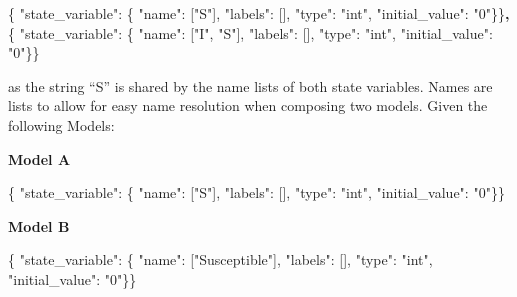 \documentclass[]{article}
\newenvironment{Shaded}{}{}
\newcommand{\DataTypeTok}[1]{\textcolor[rgb]{0.56,0.13,0.00}{#1}}
\newcommand{\StringTok}[1]{\textcolor[rgb]{0.25,0.44,0.63}{#1}}
\newcommand{\OtherTok}[1]{\textcolor[rgb]{0.00,0.44,0.13}{#1}}
\newcommand{\FunctionTok}[1]{\textcolor[rgb]{0.02,0.16,0.49}{#1}}
\newcommand{\ErrorTok}[1]{\textcolor[rgb]{1.00,0.00,0.00}{\textbf{#1}}}
\begin{document}
\begin{Shaded}
\begin{Highlighting}[]
\FunctionTok{\{} \DataTypeTok{"state_variable"}\FunctionTok{:} \FunctionTok{\{} \DataTypeTok{"name"}\FunctionTok{:} \OtherTok{[}\StringTok{"S"}\OtherTok{]}\FunctionTok{,} \DataTypeTok{"labels"}\FunctionTok{:} \OtherTok{[]}\FunctionTok{,} \DataTypeTok{"type"}\FunctionTok{:} \StringTok{"int"}\FunctionTok{,}
    \DataTypeTok{"initial_value"}\FunctionTok{:} \StringTok{"0"}\FunctionTok{\}\}}\ErrorTok{,}
\FunctionTok{\{} \DataTypeTok{"state_variable"}\FunctionTok{:} \FunctionTok{\{} \DataTypeTok{"name"}\FunctionTok{:} \OtherTok{[}\StringTok{"I"}\OtherTok{,} \StringTok{"S"}\OtherTok{]}\FunctionTok{,} \DataTypeTok{"labels"}\FunctionTok{:} \OtherTok{[]}\FunctionTok{,} \DataTypeTok{"type"}\FunctionTok{:} \StringTok{"int"}\FunctionTok{,}
    \DataTypeTok{"initial_value"}\FunctionTok{:} \StringTok{"0"}\FunctionTok{\}\}}
\end{Highlighting}
\end{Shaded}

as the string ``S'' is shared by the name lists of both state variables.
Names are lists to allow for easy name resolution when composing two
models. Given the following Models:

\textbf{Model A}

\begin{Shaded}
\begin{Highlighting}[]
\FunctionTok{\{} \DataTypeTok{"state_variable"}\FunctionTok{:} \FunctionTok{\{} \DataTypeTok{"name"}\FunctionTok{:} \OtherTok{[}\StringTok{"S"}\OtherTok{]}\FunctionTok{,} \DataTypeTok{"labels"}\FunctionTok{:} \OtherTok{[]}\FunctionTok{,} \DataTypeTok{"type"}\FunctionTok{:} \StringTok{"int"}\FunctionTok{,}
    \DataTypeTok{"initial_value"}\FunctionTok{:} \StringTok{"0"}\FunctionTok{\}\}}
\end{Highlighting}
\end{Shaded}

\textbf{Model B}

\begin{Shaded}
\begin{Highlighting}[]
\FunctionTok{\{} \DataTypeTok{"state_variable"}\FunctionTok{:} \FunctionTok{\{} \DataTypeTok{"name"}\FunctionTok{:} \OtherTok{[}\StringTok{"Susceptible"}\OtherTok{]}\FunctionTok{,} \DataTypeTok{"labels"}\FunctionTok{:} \OtherTok{[]}\FunctionTok{,} \DataTypeTok{"type"}\FunctionTok{:} \StringTok{"int"}\FunctionTok{,}
    \DataTypeTok{"initial_value"}\FunctionTok{:} \StringTok{"0"}\FunctionTok{\}\}}
\end{Highlighting}
\end{Shaded}
\end{document}
